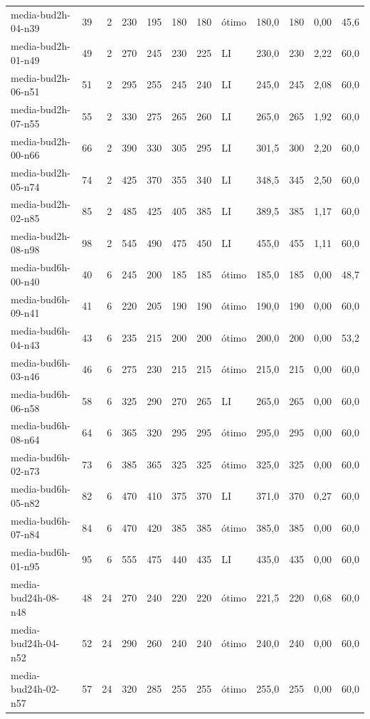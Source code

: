 \begin{longtable}{@{}lrrrrrrlrrrr@{}}
media-bud2h-04-n39 & 39 & 2 & 230 & 195 & 180 & 180 & ótimo & 180,0 & 180 & 0,00 & 45,6 \\
media-bud2h-01-n49 & 49 & 2 & 270 & 245 & 230 & 225 & LI & 230,0 & 230 & 2,22 & 60,0 \\
media-bud2h-06-n51 & 51 & 2 & 295 & 255 & 245 & 240 & LI & 245,0 & 245 & 2,08 & 60,0 \\
media-bud2h-07-n55 & 55 & 2 & 330 & 275 & 265 & 260 & LI & 265,0 & 265 & 1,92 & 60,0 \\
media-bud2h-00-n66 & 66 & 2 & 390 & 330 & 305 & 295 & LI & 301,5 & 300 & 2,20 & 60,0 \\
media-bud2h-05-n74 & 74 & 2 & 425 & 370 & 355 & 340 & LI & 348,5 & 345 & 2,50 & 60,0 \\
media-bud2h-02-n85 & 85 & 2 & 485 & 425 & 405 & 385 & LI & 389,5 & 385 & 1,17 & 60,0 \\
media-bud2h-08-n98 & 98 & 2 & 545 & 490 & 475 & 450 & LI & 455,0 & 455 & 1,11 & 60,0 \\
media-bud6h-00-n40 & 40 & 6 & 245 & 200 & 185 & 185 & ótimo & 185,0 & 185 & 0,00 & 48,7 \\
media-bud6h-09-n41 & 41 & 6 & 220 & 205 & 190 & 190 & ótimo & 190,0 & 190 & 0,00 & 60,0 \\
media-bud6h-04-n43 & 43 & 6 & 235 & 215 & 200 & 200 & ótimo & 200,0 & 200 & 0,00 & 53,2 \\
media-bud6h-03-n46 & 46 & 6 & 275 & 230 & 215 & 215 & ótimo & 215,0 & 215 & 0,00 & 60,0 \\
media-bud6h-06-n58 & 58 & 6 & 325 & 290 & 270 & 265 & LI & 265,0 & 265 & 0,00 & 60,0 \\
media-bud6h-08-n64 & 64 & 6 & 365 & 320 & 295 & 295 & ótimo & 295,0 & 295 & 0,00 & 60,0 \\
media-bud6h-02-n73 & 73 & 6 & 385 & 365 & 325 & 325 & ótimo & 325,0 & 325 & 0,00 & 60,0 \\
media-bud6h-05-n82 & 82 & 6 & 470 & 410 & 375 & 370 & LI & 371,0 & 370 & 0,27 & 60,0 \\
media-bud6h-07-n84 & 84 & 6 & 470 & 420 & 385 & 385 & ótimo & 385,0 & 385 & 0,00 & 60,0 \\
media-bud6h-01-n95 & 95 & 6 & 555 & 475 & 440 & 435 & LI & 435,0 & 435 & 0,00 & 60,0 \\
media-bud24h-08-n48 & 48 & 24 & 270 & 240 & 220 & 220 & ótimo & 221,5 & 220 & 0,68 & 60,0 \\
media-bud24h-04-n52 & 52 & 24 & 290 & 260 & 240 & 240 & ótimo & 240,0 & 240 & 0,00 & 60,0 \\
media-bud24h-02-n57 & 57 & 24 & 320 & 285 & 255 & 255 & ótimo & 255,0 & 255 & 0,00 & 60,0 \\

\end{longtable}
